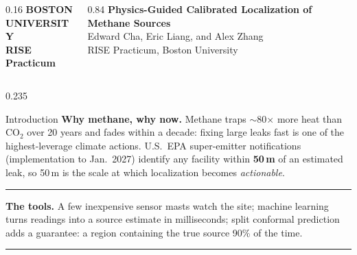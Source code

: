 \documentclass[final]{beamer}
\newcommand{\srule}{\textcolor{accent}{\rule{\linewidth}{1.2mm}}}
\begin{document}
\begin{frame}[t]

\begin{tcolorbox}[colback=navy, colframe=navy, arc=6mm, left=12mm,
                  right=12mm, top=9mm, bottom=9mm]
\begin{columns}[c]
\begin{column}{0.16\linewidth}
  \centering
  {\color{white}\bfseries\LARGE BOSTON\\ UNIVERSITY\\[2mm]
   {\color{paleblue}\Large RISE Practicum}}
\end{column}
\begin{column}{0.84\linewidth}
  \centering
  {\color{white}\bfseries\fontsize{72}{80}\selectfont
   Physics-Guided Calibrated Localization of Methane Sources\\[6mm]}
  {\color{paleblue}\LARGE Edward Cha, Eric Liang, and Alex Zhang\\[2mm]
   \large RISE Practicum, Boston University}
\end{column}
\end{columns}
\end{tcolorbox}

\vspace{10mm}

\begin{columns}[t]

\begin{column}{0.235\linewidth}

\begin{pbox}{Introduction}
\textbf{Why methane, why now.} Methane traps $\sim$80$\times$ more heat
than CO$_2$ over 20 years and fades within a decade: fixing large leaks
fast is one of the highest-leverage climate actions. U.S.\ EPA
super-emitter notifications (implementation to Jan.\ 2027) identify any
facility within \textbf{50\,m} of an estimated leak, so 50\,m is the
scale at which localization becomes \emph{actionable}.

\srule

\textbf{The tools.} A few inexpensive sensor masts watch the site;
machine learning turns readings into a source estimate in milliseconds;
split conformal prediction adds a guarantee: a region containing the
true source 90\% of the time.

\srule


\end{pbox}
\end{column}
\end{columns}
\end{frame}
\end{document}
